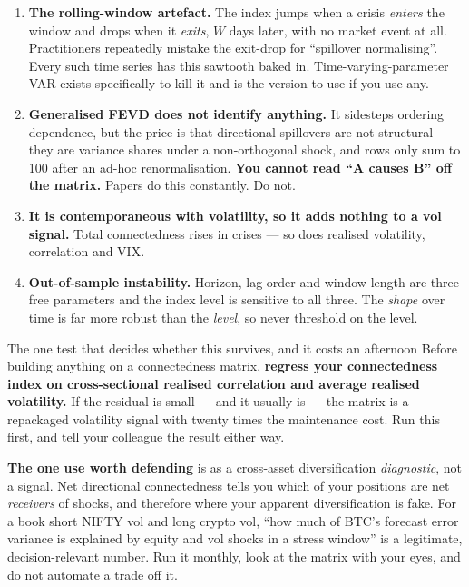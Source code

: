 \documentclass[11pt,a4paper]{article}
\begin{document}
\begin{enumerate}
\item \textbf{The rolling-window artefact.} The index jumps when a crisis
\emph{enters} the window and drops when it \emph{exits}, $W$ days later, with no
market event at all. Practitioners repeatedly mistake the exit-drop for
``spillover normalising''. Every such time series has this sawtooth baked in.
Time-varying-parameter VAR exists specifically to kill it and is the version to use
if you use any.
\item \textbf{Generalised FEVD does not identify anything.} It sidesteps ordering
dependence, but the price is that directional spillovers are not structural ---
they are variance shares under a non-orthogonal shock, and rows only sum to 100
after an ad-hoc renormalisation. \textbf{You cannot read ``A causes B'' off the
matrix.} Papers do this constantly. Do not.
\item \textbf{It is contemporaneous with volatility, so it adds nothing to a vol
signal.} Total connectedness rises in crises --- so does realised volatility,
correlation and VIX.
\item \textbf{Out-of-sample instability.} Horizon, lag order and window length are
three free parameters and the index level is sensitive to all three. The
\emph{shape} over time is far more robust than the \emph{level}, so never threshold
on the level.
\end{enumerate}

\begin{keyfact}{The one test that decides whether this survives, and it costs an afternoon}
Before building anything on a connectedness matrix, \textbf{regress your
connectedness index on cross-sectional realised correlation and average realised
volatility.} If the residual is small --- and it usually is --- the matrix is a
repackaged volatility signal with twenty times the maintenance cost. Run this
first, and tell your colleague the result either way.
\end{keyfact}

\textbf{The one use worth defending} is as a cross-asset diversification
\emph{diagnostic}, not a signal. Net directional connectedness tells you which of
your positions are net \emph{receivers} of shocks, and therefore where your
apparent diversification is fake. For a book short NIFTY vol and long crypto vol,
``how much of BTC's forecast error variance is explained by equity and vol shocks
in a stress window'' is a legitimate, decision-relevant number. Run it monthly,
look at the matrix with your eyes, and do not automate a trade off it.
\end{document}
